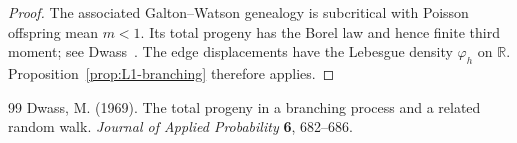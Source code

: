 \documentclass[10pt,a4paper]{amsart}
\newcommand{\R}{\mathbb{R}}
\begin{document}
\begin{proof}
The associated Galton--Watson genealogy is subcritical with Poisson
offspring mean \(m<1\). Its total progeny has the Borel law and hence
finite third moment; see Dwass~\cite{dwass1969total}. The edge
displacements have the Lebesgue density \(\varphi_h\) on \(\R\).
Proposition~\ref{prop:L1-branching} therefore applies.
\end{proof}

\begin{thebibliography}{99}
 Dwass, M. (1969). The total progeny in a branching process and a related random walk. \emph{Journal of Applied Probability} \textbf{6}, 682--686.
\end{thebibliography}
\end{document}
